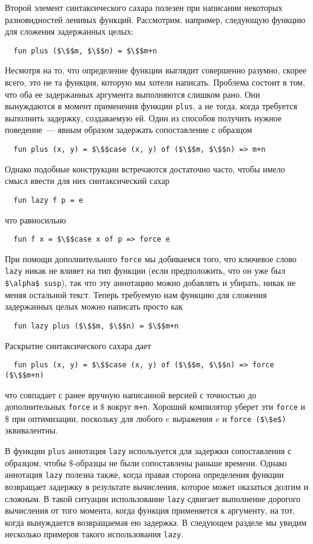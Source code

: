 Второй элемент синтаксического сахара полезен при написании некоторых
разновидностей ленивых функций. Рассмотрим, например, следующую
функцию для сложения задержанных целых:
\begin{lstlisting}
  fun plus ($\$$m, $\$$n) = $\$$m+n
\end{lstlisting}
Несмотря на то, что определение функции выглядит совершенно разумно,
скорее всего, это не та функция, которую мы хотели написать. Проблема
состоит в том, что оба ее задержанных аргумента выполняются слишком
рано.  Они вынуждаются в момент применения функции
\lstinline!plus!, а не тогда, когда требуется выполнить задержку,
создаваемую ей.  Один из способов получить нужное
поведение~--- явным образом задержать сопоставление с образцом
\begin{lstlisting}
  fun plus (x, y) = $\$$case (x, y) of ($\$$m, $\$$n) => m+n
\end{lstlisting}
Однако подобные конструкции встречаются достаточно часто, чтобы
имело смысл ввести для них синтаксический сахар
\begin{lstlisting}
  fun lazy f p = e
\end{lstlisting}
что равносильно
\begin{lstlisting}
  fun f x = $\$$case x of p => force e
\end{lstlisting}
При помощи дополнительного \lstinline!force! мы добиваемся того, что
ключевое слово \lstinline!lazy! никак не влияет на тип функции (если
предположить, что он уже был \lstinline!$\alpha$ susp!), так что эту
аннотацию можно добавлять и убирать, никак не меняя остальной
текст. Теперь требуемую нам функцию для сложения задержанных целых
можно написать просто как
\begin{lstlisting}
  fun lazy plus ($\$$m, $\$$n) = $\$$m+n
\end{lstlisting}
Раскрытие синтаксического сахара дает
\begin{lstlisting}
  fun plus (x, y) = $\$$case (x, y) of ($\$$m, $\$$n) => force ($\$$m+n)
\end{lstlisting}
что совпадает с ранее вручную написанной версией с
точностью до дополнительных \lstinline!force! и $\$$ вокруг
\lstinline!m+n!. Хороший компилятор уберет эти \lstinline!force! и
$\$$ при оптимизации, поскольку для любого $e$ выражения $e$ и 
\lstinline!force ($\$e$)! эквивалентны.

В функции \lstinline!plus! аннотация \lstinline!lazy! используется для
задержки сопоставления с образцом, чтобы $\$$-образцы не были
сопоставлены раньше времени. Однако аннотация \lstinline!lazy! полезна
также, когда правая сторона определения функции возвращает задержку
в результате вычисления, которое может оказаться долгим и 
сложным.  В такой ситуации использование \lstinline!lazy! сдвигает
выполнение дорогого вычисления от того момента, когда функция
применяется к аргументу, на тот, когда вынуждается возвращаемая ею
задержка. В следующем разделе мы увидим несколько
примеров такого использования \lstinline!lazy!.


